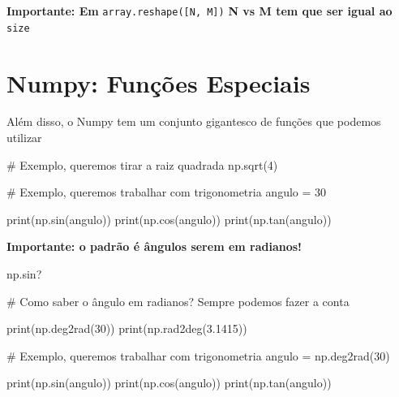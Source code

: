 \documentclass[
  letterpaper,
  DIV=11,
  numbers=noendperiod]{scrreprt}
\newenvironment{Shaded}{\begin{snugshade}}{\end{snugshade}}
\newcommand{\NormalTok}[1]{\textcolor[rgb]{0.00,0.23,0.31}{#1}}
\begin{document}
\textbf{Importante: Em} \texttt{array.reshape({[}N,\ M{]})} \textbf{N vs
M tem que ser igual ao} \texttt{size}

\section{Numpy: Funções Especiais}\label{numpy-funuxe7uxf5es-especiais}

Além disso, o Numpy tem um conjunto gigantesco de funções que podemos
utilizar

\begin{Shaded}
\begin{Highlighting}[]
\NormalTok{\# Exemplo, queremos tirar a raiz quadrada}
\NormalTok{np.sqrt(4)}
\end{Highlighting}
\end{Shaded}

\begin{Shaded}
\begin{Highlighting}[]
\NormalTok{\# Exemplo, queremos trabalhar com trigonometria}
\NormalTok{angulo = 30}

\NormalTok{print(np.sin(angulo))}
\NormalTok{print(np.cos(angulo))}
\NormalTok{print(np.tan(angulo))}
\end{Highlighting}
\end{Shaded}

\textbf{Importante: o padrão é ângulos serem em radianos!}

\begin{Shaded}
\begin{Highlighting}[]
\NormalTok{np.sin?}
\end{Highlighting}
\end{Shaded}

\begin{Shaded}
\begin{Highlighting}[]
\NormalTok{\# Como saber o ângulo em radianos? Sempre podemos fazer a conta}

\NormalTok{print(np.deg2rad(30))}
\NormalTok{print(np.rad2deg(3.1415))}
\end{Highlighting}
\end{Shaded}

\begin{Shaded}
\begin{Highlighting}[]
\NormalTok{\# Exemplo, queremos trabalhar com trigonometria}
\NormalTok{angulo = np.deg2rad(30)}

\NormalTok{print(np.sin(angulo))}
\NormalTok{print(np.cos(angulo))}
\NormalTok{print(np.tan(angulo))}
\end{Highlighting}
\end{Shaded}
\end{document}
